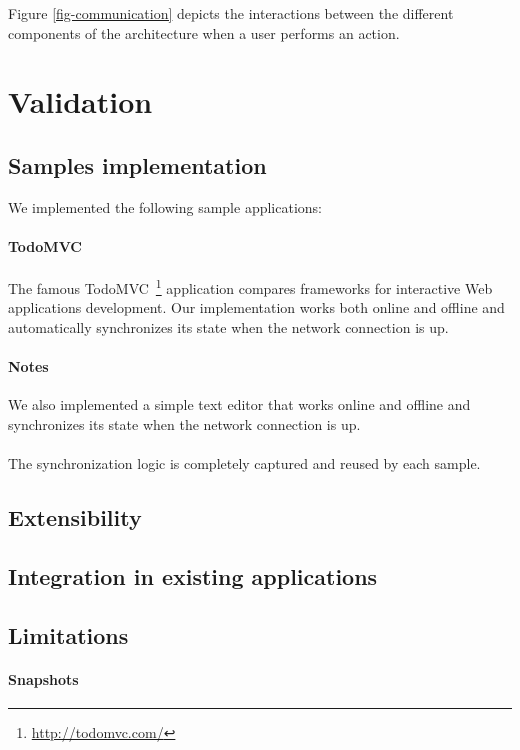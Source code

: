 \documentclass{llncs}
\begin{document}
Figure \ref{fig-communication} depicts the interactions between the different components of the architecture when a user performs an action.

\section{Validation}

\subsection{Samples implementation}

We implemented the following sample applications:

\paragraph{TodoMVC} The famous TodoMVC~\footnote{\href{http://todomvc.com/}{http://todomvc.com/}} application compares frameworks for interactive Web applications development. Our implementation works both online and offline and automatically synchronizes its state when the network connection is up.

\paragraph{Notes} We also implemented a simple text editor that works online and offline and synchronizes its state when the network connection is up.

\paragraph{}The synchronization logic is completely captured and reused by each sample.

\subsection{Extensibility}

\subsection{Integration in existing applications}

\subsection{Limitations}

\paragraph{Snapshots}
\end{document}

